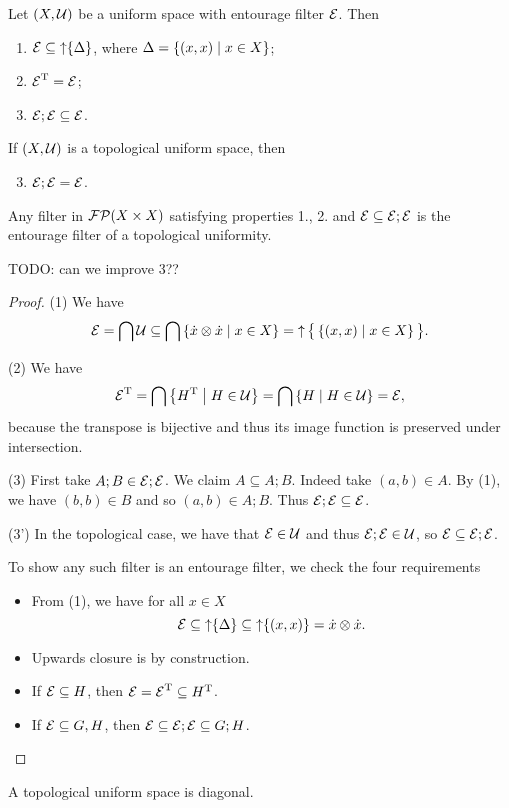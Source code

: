 \begin{lemma} \label{entourageLemma}
Let $\left( X,\mathcal{U} \right)$ be a uniform space with entourage filter $\operatorname{\mathcal{E}}$. Then
\begin{enumerate}
\item $\operatorname{\mathcal{E}}\subseteq \operatorname{\uparrow}\{\Delta\}$, where $\Delta = \left\{ (x,x) \;\middle|\; x\in X \right\}$;
\item $\operatorname{\mathcal{E}}^{\mathrm{T}} = \operatorname{\mathcal{E}}$;
\item $\operatorname{\mathcal{E}};\operatorname{\mathcal{E}} \subseteq \operatorname{\mathcal{E}}$.
\end{enumerate}
If $\left( X,\mathcal{U} \right)$ is a topological uniform space, then
\begin{enumerate}[1'.] \setcounter{enumi}{2}
\item $\operatorname{\mathcal{E}};\operatorname{\mathcal{E}} = \operatorname{\mathcal{E}}$.
\end{enumerate}
Any filter in $\operatorname{\mathcal{FP}}(X\times X)$ satisfying properties 1., 2. and $\operatorname{\mathcal{E}} \subseteq \operatorname{\mathcal{E}};\operatorname{\mathcal{E}}$ is the entourage filter of a topological uniformity.
\end{lemma}
TODO: can we improve 3??
\begin{proof}
(1) We have
\[ \operatorname{\mathcal{E}} = \bigcap \mathcal{U} \subseteq \bigcap \left\{ \dot{x}\otimes \dot{x} \;\middle|\; x\in X \right\} = \operatorname{\uparrow}\big\{\left\{ (x,x) \;\middle|\; x\in X \right\}\big\}. \]

(2) We have
\[ \operatorname{\mathcal{E}}^{\mathrm{T}} = \bigcap \left\{ H^{\mathrm{T}} \;\middle|\; H\in\mathcal{U} \right\} = \bigcap \left\{ H \;\middle|\; H\in\mathcal{U} \right\} = \operatorname{\mathcal{E}}, \]
because the transpose is bijective and thus its image function is preserved under intersection.

(3) First take $A;B \in\operatorname{\mathcal{E}};\operatorname{\mathcal{E}}$. We claim $A\subseteq A;B$. Indeed take $(a,b)\in A$. By (1), we have $(b,b)\in B$ and so $(a,b)\in A;B$. Thus $\operatorname{\mathcal{E}};\operatorname{\mathcal{E}} \subseteq \operatorname{\mathcal{E}}$.

(3') In the topological case, we have that $\operatorname{\mathcal{E}}\in\mathcal{U}$ and thus $\operatorname{\mathcal{E}};\operatorname{\mathcal{E}}\in \mathcal{U}$, so $\operatorname{\mathcal{E}} \subseteq \operatorname{\mathcal{E}};\operatorname{\mathcal{E}}$.

To show any such filter is an entourage filter, we check the four requirements
\begin{itemize}
\item From (1), we have for all $x\in X$
\[ \operatorname{\mathcal{E}} \subseteq \operatorname{\uparrow}\{\Delta\} \subseteq \operatorname{\uparrow}\{(x,x)\} = \dot{x}\otimes\dot{x}. \]
\item Upwards closure is by construction.
\item If $\operatorname{\mathcal{E}} \subseteq H$, then $\operatorname{\mathcal{E}} = \operatorname{\mathcal{E}}^{\mathrm{T}} \subseteq H^{\mathrm{T}}$.
\item If $\operatorname{\mathcal{E}}\subseteq G,H$, then $\operatorname{\mathcal{E}} \subseteq \operatorname{\mathcal{E}};\operatorname{\mathcal{E}} \subseteq G;H$.
\end{itemize}
\end{proof}
\begin{corollary}
A topological uniform space is diagonal.
\end{corollary}

